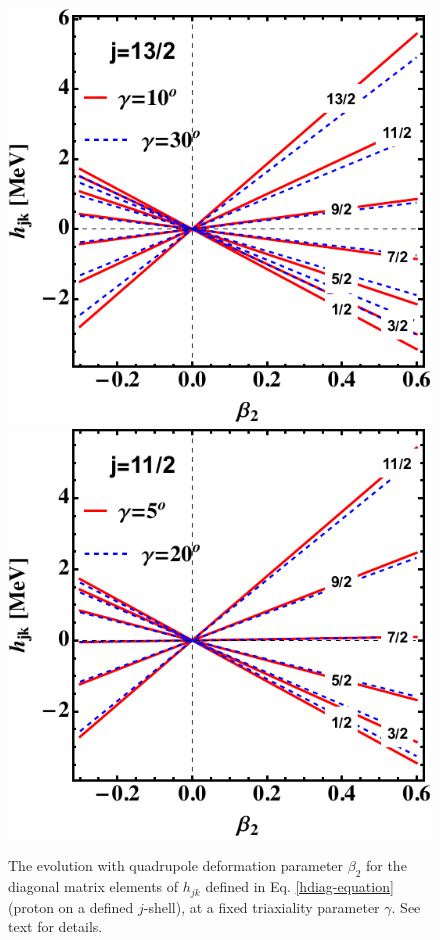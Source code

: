 \begin{figure}
    \centering
    \includegraphics[scale=0.7]{Chapters/Figures/singleParticle-hdiag-1.pdf}
    \includegraphics[scale=0.7]{Chapters/Figures/singleParticle-hdiag-2.pdf}
    \caption{The evolution with quadrupole deformation parameter $\beta_2$ for the diagonal matrix elements of $h_{jk}$ defined in Eq. \ref{hdiag-equation} (proton on a defined $j$-shell), at a fixed triaxiality parameter $\gamma$. See text for details.}
    \label{hdiag-beta-evolution}
\end{figure}

